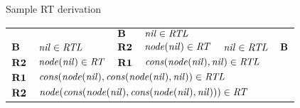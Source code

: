 \documentclass[style=simple,size=12pt]{powerdot}
\newcommand{\id}[1]{\mbox{\it #1\/}}
\newcommand{\bid}[1]{\mbox{\bf #1}}
\begin{document}
\begin{wideslide}[bm=,toc=]{Sample RT derivation}

\begin{center}
\begin{tabular}{llllll}
 & & $\bid{B}$ & $\id{nil}\in\id{RTL}$ & & \\ \cline{4-4}
$\bid{B}$ & $\id{nil}\in\id{RTL}$ & $\bid{R2}$ & $\id{node}(\id{nil})\in\id{RT}$ & $\id{nil}\in\id{RTL}$ & $\bid{B}$ \\ 
\cline{2-2} \cline{4-5}
$\bid{R2}$ & $\id{node}(\id{nil})\in\id{RT}$ & $\bid{R1}$ & \multicolumn{2}{l}{
$\id{cons}(\id{node}(\id{nil}),\id{nil})\in\id{RTL}$} & \\
\cline{2-5}
$\bid{R1}$ & \multicolumn{4}{l}{$\id{cons}(\id{node}(\id{nil}),\id{cons}(\id{node}(\id{nil}),\id{nil})) \in \id{RTL}$} \\
\cline{2-5}
$\bid{R2}$ & \multicolumn{4}{l}{$\id{node}(\id{cons}(\id{node}(\id{nil}),\id{cons}(\id{node}(\id{nil}),\id{nil})))\in\id{RT}$}
\end{tabular}
\end{center}
\end{wideslide}
\end{document}
